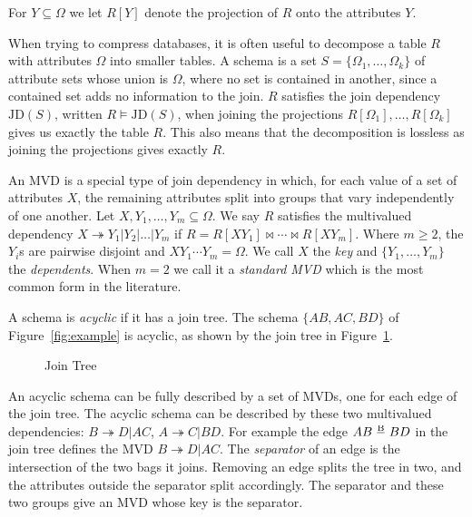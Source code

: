 \documentclass[logo,bsc,singlespacing,parskip,online]{infthesis}
\begin{document}
For $Y \subseteq \Omega$ we let $R[Y]$ denote the projection of $R$ onto the attributes $Y$.

When trying to compress databases, it is often useful to decompose a table $R$ with attributes $\Omega$ into smaller tables. A schema is a set $S = \{\Omega_1, \ldots, \Omega_k\}$ of attribute sets whose union is $\Omega$, where no set is contained in another, since a contained set adds no information to the join. $R$ satisfies the join dependency $\mathrm{JD}(S)$, written $R \models \mathrm{JD}(S)$, when joining the projections $R[\Omega_1],\ldots,R[\Omega_k]$ gives us exactly the table $R$. This also means that the decomposition is lossless as joining the projections gives exactly $R$.

An MVD is a special type of join dependency in which, for each value of a set of attributes $X$, the remaining attributes split into groups that vary independently of one another. Let $X,Y_1, \ldots, Y_m \subseteq \Omega$. We say $R$ satisfies the multivalued dependency $X \twoheadrightarrow Y_1 | Y_2 | \ldots | Y_m$  if $R = R[XY_1] \bowtie \cdots \bowtie R[XY_m]$. Where $m\geq 2$, the $Y_i$s are pairwise disjoint and $XY_1 \cdots Y_m = \Omega$. We call $X$ the \emph{key} and $\{Y_1, \ldots, Y_m\}$ the \emph{dependents}. When $m=2$ we call it a \emph{standard MVD} which is the most common form in the literature. 

A schema is \emph{acyclic} if it has a join tree. The schema $\{AB, AC, BD\}$ of Figure~\ref{fig:example} is acyclic, as shown by the join tree in Figure~\ref{fig:jointree}.

\begin{figure}[h]
\centering
{}
\caption{Join Tree}
\label{fig:jointree}
\end{figure}

An acyclic schema can be fully described by a set of MVDs, one for each edge of the join tree. The acyclic schema can be described by these two multivalued dependencies: $B \twoheadrightarrow D|AC$, $A \twoheadrightarrow C|BD$. For example the edge $AB \mathrel{\ooalign{$-$\cr\hidewidth$\smash{\raisebox{0.9ex}{$\scriptstyle\mathrm{B}$}}$\hidewidth\cr}} BD$ in the join tree defines the MVD $B \twoheadrightarrow D|AC$. The \emph{separator} of an edge is the intersection of the two bags it joins. Removing an edge splits the tree in two, and the attributes outside the separator split accordingly. The separator and these two groups give an MVD whose key is the separator.
\end{document}

